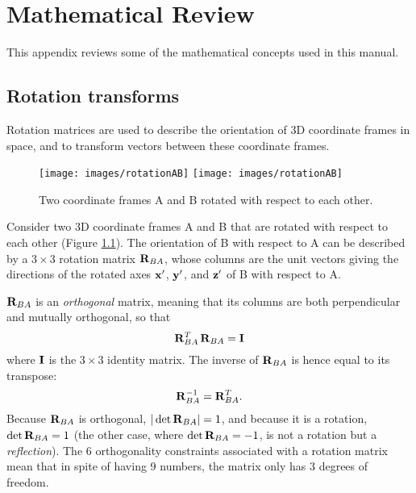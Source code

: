 \ifdefined\maindoc
\appendix
\else
\def\doctitle{Mathematical Review}

\mainmatter
\fi

\chapter{Mathematical Review}
\label{MathematicalReview:sec}

This appendix reviews some of the mathematical concepts used in this
manual.

\section{Rotation transforms}
\label{Rotations:sec}

Rotation matrices are used to describe the orientation of 3D
coordinate frames in space, and to transform vectors between these
coordinate frames.

\begin{figure}[t]
\begin{center}
 \iflatexml
   \texttt{[image: images/rotationAB]}
 \else
   \texttt{[image: images/rotationAB]}
 \fi
\end{center}
\caption{Two coordinate frames A and B rotated with respect
to each other.}
\label{rotationAB:fig}
\end{figure}

Consider two 3D coordinate frames A and B that are rotated with
respect to each other (Figure \ref{rotationAB:fig}).  The orientation
of B with respect to A can be described by a $3 \times 3$ rotation
matrix ${\bf R}_{BA}$, whose columns are the unit vectors giving the
directions of the rotated axes ${\bf x}'$, ${\bf y}'$, and ${\bf z}'$ of B with
respect to A.

${\bf R}_{BA}$ is an {\it orthogonal} matrix, meaning that
its columns are both perpendicular and mutually
orthogonal, so that
%
\begin{equation}
{\bf R}_{BA}^T \, {\bf R}_{BA} = {\bf I}
\end{equation}
%
where ${\bf I}$ is the $3 \times 3$ identity matrix. The inverse
of ${\bf R}_{BA}$ is hence equal to its transpose:
%
\begin{equation}
{\bf R}_{BA}^{-1} = {\bf R}_{BA}^T.
\label{RABinv:eqn}
\end{equation}
%
Because ${\bf R}_{BA}$ is orthogonal, $|\det {\bf R}_{BA}| = 1$, and because it
is a rotation, $\det {\bf R}_{BA} = 1$ (the other case, where $\det {\bf R}_{BA}
= -1$, is not a rotation but a {\it reflection}).  The 6 orthogonality
constraints associated with a rotation matrix mean that in spite of
having 9 numbers, the matrix only has 3 degrees of freedom.

